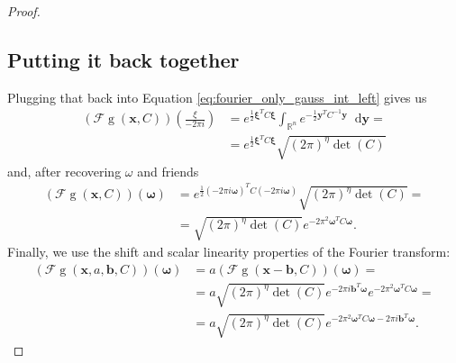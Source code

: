 \documentclass{paper}
\newcommand{\F}{\ensuremath{\mathcal{F}}}
\newcommand{\vr}[1]{\ensuremath{\boldsymbol{#1}}}
\newcommand{\f}[1]{\operatorname{#1}}
\newcommand*\diff{\mathop{}\!\mathrm{d}}
\newcommand{\omegavec}[0]{\ensuremath{\vr{\omega{}}}}
\newcommand{\xivec}[0]{\ensuremath{\vr{\xi{}}}}
\newcommand{\bvec}[0]{\ensuremath{\vr{b}}}
\newcommand{\yvec}[0]{\ensuremath{\vr{y}}}
\begin{document}
\begin{proof}
\subsection*{Putting it back together}
Plugging that back into Equation \ref{eq:fourier_only_gauss_int_left} gives us
\begin{align*}
	(\F\f{g}(\vr{x}, C))(\frac{\xi}{-2 \pi i})
	&= e^{\frac{1}{2} \xivec^T C \xivec} \int_{\mathbb{R}^n} e^{-\frac{1}{2} \yvec^T C^{-1} \yvec}  \diff \yvec = \\
	&= e^{\frac{1}{2} \xivec^T C \xivec} \sqrt{(2 \pi)^\eta \f{det}(C)}
\end{align*}
and, after recovering $\omega$ and friends
\begin{align*}
(\F\f{g}(\vr{x}, C))(\omegavec)
&= e^{\frac{1}{2} (-2 \pi i \omegavec)^T C (-2 \pi i \omegavec)} \sqrt{(2 \pi)^\eta \f{det}(C)} = \\
&= \sqrt{(2 \pi)^\eta \f{det}(C)} e^{-2 \pi^2 \omegavec^T C \omegavec}.
\end{align*}
Finally, we use the shift and scalar linearity properties of the Fourier transform:
\begin{align}
(\F\f{g}(\vr{x}, a, \bvec, C))(\omegavec) &= a (\F\f{g}(\vr{x} - \bvec, C))(\omegavec) = \nonumber \\
&= a \sqrt{(2 \pi)^\eta \f{det}(C)} e^{-2\pi i \bvec^T \omegavec} e^{-2 \pi^2 \omegavec^T C \omegavec} =\nonumber \\
&= a \sqrt{(2 \pi)^\eta \f{det}(C)} e^{-2 \pi^2 \omegavec^T C \omegavec - 2\pi i \bvec^T \omegavec}.
\end{align}

\end{proof}

\clearpage
\end{document}
